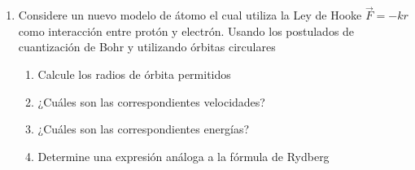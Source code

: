 \documentclass[letterpaper,11pt]{article}
\begin{document}
\begin{enumerate}




\item Considere un nuevo modelo de átomo el cual utiliza la Ley de Hooke $\vec{F} = -kr$ como interacción entre protón y electrón. Usando los postulados de cuantización de Bohr y utilizando órbitas circulares

\begin{enumerate}
    \item Calcule los radios de órbita permitidos

    \item ¿Cuáles son las correspondientes velocidades?

    \item ¿Cuáles son las correspondientes energías?

    \item Determine una expresión análoga a la fórmula de Rydberg
\end{enumerate}



\end{enumerate}
\end{document}

